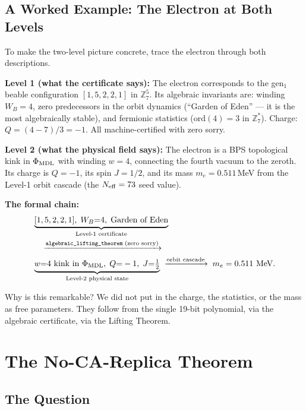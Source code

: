 \documentclass[11pt,a4paper]{article}
\newcommand{\lean}[1]{\texttt{#1}}
\newcommand{\PhiMDL}{\Phi_{\rm MDL}}
\newcommand{\ZS}{\mathbb{Z}_7}
\theoremstyle{definition}
\begin{document}
\subsection{A Worked Example: The Electron at Both Levels}

To make the two-level picture concrete, trace the electron through both descriptions.

\medskip
\noindent\textbf{Level 1 (what the certificate says):}
The electron corresponds to the gen$_1$ beable configuration $[1,5,2,2,1]$ in
$\ZS^5$.
Its algebraic invariants are: winding $W_B = 4$, zero predecessors in the orbit
dynamics (``Garden of Eden'' --- it is the most algebraically stable),
and fermionic statistics (ord$(4) = 3$ in $\ZS^*$).
Charge: $Q = (4-7)/3 = -1$.
All machine-certified with zero sorry.

\medskip
\noindent\textbf{Level 2 (what the physical field says):}
The electron is a BPS topological kink in $\PhiMDL$ with winding $w = 4$,
connecting the fourth vacuum to the zeroth.
Its charge is $Q = -1$, its spin $J = 1/2$, and its mass $m_e = 0.511$\,MeV
from the Level-1 orbit cascade (the $N_{\rm eff} = 73$ seed value).

\medskip
\noindent\textbf{The formal chain:}
\begin{align*}
&\underbrace{[1,5,2,2,1],\; W_B{=}4,\;\text{Garden of Eden}}_{\text{Level-1 certificate}}\\
&\quad\xrightarrow{\lean{algebraic\_lifting\_theorem}\;(\text{zero sorry})}\\
&\underbrace{w{=}4 \text{ kink in }\PhiMDL,\;Q{=}-1,\;J{=}\tfrac{1}{2}}_{\text{Level-2 physical state}}
\;\xrightarrow{\text{orbit cascade}}\;
m_e = 0.511\text{ MeV}.
\end{align*}

Why is this remarkable?  We did not put in the charge, the statistics, or the mass
as free parameters.  They follow from the single 19-bit polynomial, via the
algebraic certificate, via the Lifting Theorem.

\section{The No-CA-Replica Theorem}
\label{sec:noca}

\subsection{The Question}
\end{document}
